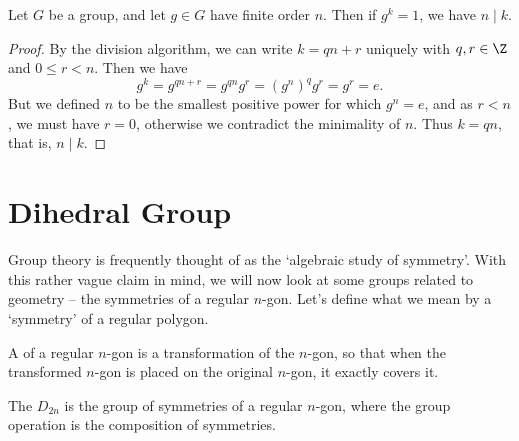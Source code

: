 \documentclass[a4]{scrreprt}
\begin{document}
\begin{theorem}
	Let $G$ be a group, and let $g \in G$ have finite order $n$. Then if $g^k = 1$, we have $n \mid k$.
\end{theorem}
\begin{proof}
	By the division algorithm, we can write $k = qn + r$ uniquely with $q, r \in \Z$ and $0 \leq r < n$. Then we have
	$$
	g^{k} = g^{qn + r} = g^{qn} g^r = (g^n)^q g^r = g^r = e.
	$$
	But we defined $n$ to be the smallest positive power for which $g^n = e$, and as $r < n$, we must have $r = 0$, otherwise we contradict the minimality of $n$. Thus $k = qn$, that is, $n \mid k$.
\end{proof}

\section{Dihedral Group}

Group theory is frequently thought of as the `algebraic study of symmetry'. With this rather vague claim in mind, we will now look at some groups related to geometry -- the symmetries of a regular $n$-gon. Let's define what we mean by a `symmetry' of a regular polygon.

\begin{definition}
	A  of a regular $n$-gon is a transformation of the $n$-gon, so that when the transformed $n$-gon is placed on the original $n$-gon, it exactly covers it.
\end{definition}

\begin{definition}
	The  $D_{2n}$ is the group of symmetries of a regular $n$-gon, where the group operation is the composition of symmetries.
\end{definition}
\end{document}
